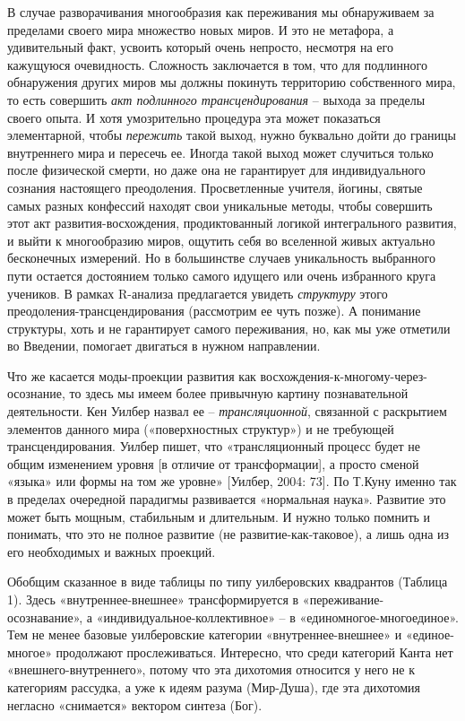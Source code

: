    В случае разворачивания многообразия как переживания мы обнаруживаем за пределами своего мира множество новых миров. И это не метафора, а удивительный факт, усвоить который очень непросто, несмотря на его кажущуюся очевидность. Сложность заключается в том, что для подлинного обнаружения других миров мы должны покинуть территорию собственного мира, то есть совершить \textit{акт подлинного трансцендирования} – выхода за пределы своего опыта. И хотя умозрительно процедура эта может показаться элементарной, чтобы \textit{пережить} такой выход, нужно буквально дойти до границы внутреннего мира и пересечь ее. Иногда такой выход может случиться только после физической смерти, но даже она не гарантирует для индивидуального сознания настоящего преодоления. Просветленные учителя, йогины, святые самых разных конфессий находят свои уникальные методы, чтобы совершить этот акт развития-восхождения, продиктованный логикой интегрального развития, и выйти к многообразию миров, ощутить себя во вселенной живых актуально бесконечных измерений. Но в большинстве случаев уникальность выбранного пути остается достоянием только самого идущего или очень избранного круга учеников. В рамках R-анализа предлагается увидеть \textit{структуру} этого преодоления-трансцендирования (рассмотрим ее чуть позже). А понимание структуры, хоть и не гарантирует самого переживания, но, как мы уже отметили во Введении, помогает двигаться в нужном направлении.

    Что же касается моды-проекции развития как восхождения-к-многому-через-осознание, то здесь мы имеем более привычную картину познавательной деятельности. Кен Уилбер назвал ее – \textit{трансляционной}, связанной с раскрытием элементов данного мира («поверхностных структур») и не требующей трансцендирования. Уилбер пишет, что «трансляционный процесс будет не общим изменением уровня [в отличие от трансформации], а просто сменой «языка» или формы на том же уровне» [Уилбер, 2004: 73]. По Т.Куну именно так в пределах очередной парадигмы развивается «нормальная наука». Развитие это может быть мощным, стабильным и длительным. И нужно только помнить и понимать, что это не полное развитие (не развитие-как-таковое), а лишь одна из его необходимых и важных проекций.

    Обобщим сказанное в виде таблицы по типу уилберовских квадрантов (Таблица 1). Здесь «внутреннее-внешнее» трансформируется в «переживание-осознавание», а «индивидуальное-коллективное» – в «единомногое-многоединое». Тем не менее базовые уилберовские категории «внутреннее-внешнее» и «единое-многое» продолжают прослеживаться. Интересно, что среди категорий Канта нет «внешнего-внутреннего», потому что эта дихотомия относится у него не к категориям рассудка, а уже к идеям разума (Мир-Душа), где эта дихотомия негласно «снимается» вектором синтеза (Бог).

